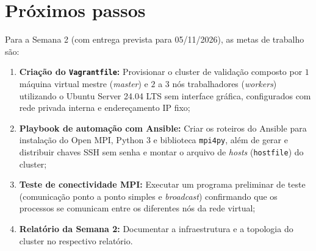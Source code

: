 \section{Próximos passos}

Para a Semana 2 (com entrega prevista para 05/11/2026), as metas de trabalho
são:
\begin{enumerate}
  \item \textbf{Criação do \texttt{Vagrantfile}:} Provisionar o cluster de
    validação composto por $1$ máquina virtual mestre (\emph{master}) e $2$ a
    $3$ nós trabalhadores (\emph{workers}) utilizando o Ubuntu Server 24.04 LTS
    sem interface gráfica, configurados com rede privada interna e endereçamento
    IP fixo;
  \item \textbf{Playbook de automação com Ansible:} Criar os roteiros do Ansible
    para instalação do Open MPI, Python 3 e biblioteca \texttt{mpi4py}, além de
    gerar e distribuir chaves SSH sem senha e montar o arquivo de \emph{hosts}
    (\texttt{hostfile}) do cluster;
  \item \textbf{Teste de conectividade MPI:} Executar um programa preliminar de
    teste (comunicação ponto a ponto simples e \emph{broadcast}) confirmando
    que os processos se comunicam entre os diferentes nós da rede virtual;
  \item \textbf{Relatório da Semana 2:} Documentar a infraestrutura e a topologia
    do cluster no respectivo relatório.
\end{enumerate}

